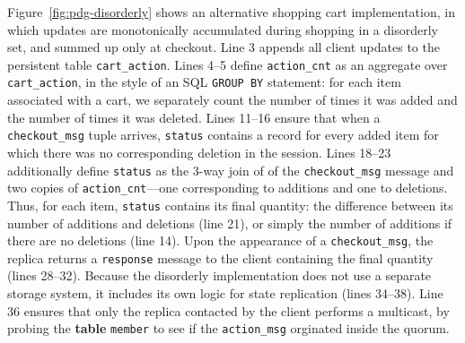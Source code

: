 Figure~\ref{fig:pdg-disorderly} shows an alternative shopping cart implementation, in which
updates are monotonically accumulated during shopping in a disorderly set, and summed up
only at checkout.  Line 3 appends all client updates to the persistent table
\texttt{cart\_action}.  Lines 4--5 define \texttt{action\_cnt} as an aggregate
over \texttt{cart\_action}, in the style of an SQL \texttt{GROUP BY} statement: for each
item associated with a cart, we separately count the number of times it was
added and the number of times it was deleted.   
Lines 11--16 ensure that when a \texttt{checkout\_msg} tuple arrives, \texttt{status} 
contains a record for every added item
for which there was no corresponding deletion in the session.  Lines 18--23 
additionally define \texttt{status} as the 3-way join of of the \texttt{checkout\_msg}
message and two copies of \texttt{action\_cnt}---one corresponding to additions and one to
deletions.
Thus, for each item, \texttt{status} contains its final quantity: the
difference between its number of additions and deletions (line 21), or simply the number
of additions if there are no deletions (line 14). 
Upon the appearance of a \texttt{checkout\_msg}, the
replica returns a \texttt{response} message to the client containing the
final quantity (lines 28--32).  
Because the disorderly implementation does not use a separate
storage system, it includes its own logic for state replication (lines 34--38).
Line 36 ensures that only the replica contacted by the client performs a multicast,
by probing the \textbf{table} \texttt{member} to see if the \texttt{action\_msg} 
orginated inside the quorum.


